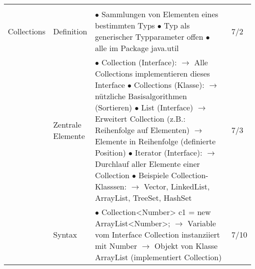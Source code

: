 \documentclass[11pt,a4paper]{article}
\begin{document}
\begin{center}
\begin{longtable}[h]{ | p{2.3cm} | p{2.3cm} | p{12.6cm} | p{1.2cm} | }
	&  & \makecell[l]{$\bullet$  }  &  \\ 
	\hline
	
	
	
	\multicolumn{3}{c}{} \\ 
	\hline 
	
	
	
	{\large Collections } & Definition  & \makecell[l]{$\bullet$ Sammlungen von Elementen eines bestimmten Typs \\ 
	$\bullet$ Typ als generischer Typparameter offen \\
	$\bullet$ alle im Package java.util } & 7/2 \\ \cline{2-4}
	
	& \makecell[l]{ Zentrale \\ Elemente } & \makecell[l]{$\bullet$ Collection (Interface): \\ 
	\hspace{0.4cm} $\rightarrow$ Alle Collections implementieren dieses Interface \\
	$\bullet$ Collections (Klasse): \\ 
	\hspace{0.4cm} $\rightarrow$ nützliche Basisalgorithmen (Sortieren)\\
	$\bullet$ List (Interface) \\
	\hspace{0.4cm} $\rightarrow$ Erweitert Collection (z.B.: Reihenfolge auf Elementen) \\
	\hspace{0.4cm} $\rightarrow$ Elemente in Reihenfolge (definierte Position) \\
	$\bullet$ Iterator (Interface): \\ 
	\hspace{0.4cm} $\rightarrow$ Durchlauf aller Elemente einer Collection \\
	$\bullet$ Beispiele Collection-Klasssen: \\
	\hspace{0.4cm} $\rightarrow$ Vector, LinkedList, ArrayList, TreeSet, HashSet}  & 7/3 \\ \cline{2-4}
	
	& Syntax & \makecell[l]{$\bullet$ Collection<Number> c1 = new ArrayList<Number>; \\ 
	\hspace{0.4cm} $\rightarrow$ Variable vom Interface Collection instanziiert mit Number \\
	\hspace{0.4cm} $\rightarrow$ Objekt von Klasse ArrayList (implementiert Collection) }  & 7/10 \\ \cline{2-4}
	

\end{longtable}
\end{center}
\end{document}
